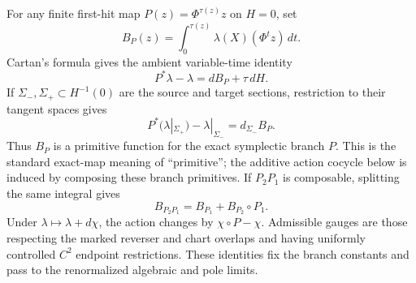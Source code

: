 \documentclass[11pt]{amsart}
\numberwithin{equation}{section}
\theoremstyle{definition}
\theoremstyle{remark}
\begin{document}
For any finite first-hit map $P(z)=\Phi^{\tau(z)}z$ on $H=0$, set
\begin{equation}\label{eq:actual-action}
 B_P(z)=\int_0^{\tau(z)}\lambda(X)(\Phi^tz)\,dt.
\end{equation}
Cartan's formula gives the ambient variable-time identity
\begin{equation}\label{eq:ambient-exact-flight}
 P^*\lambda-\lambda=dB_P+\tau\,dH.
\end{equation}
If $\Sigma_-,\Sigma_+\subset H^{-1}(0)$ are the source and target
sections, restriction to their tangent spaces gives
\begin{equation}\label{eq:exact-flight}
 P^*(\lambda|_{\Sigma_+})-\lambda|_{\Sigma_-}
 =d_{\Sigma_-}B_P.
\end{equation}
Thus $B_P$ is a primitive function for the exact symplectic branch $P$.
This is the standard exact-map meaning of ``primitive''; the additive
action cocycle below is induced by composing these branch primitives.
If $P_2P_1$ is composable, splitting the same integral gives
\begin{equation}\label{eq:action-composition}
 B_{P_2P_1}=B_{P_1}+B_{P_2}\circ P_1.
\end{equation}
Under $\lambda\mapsto\lambda+d\chi$, the action changes by
$\chi\circ P-\chi$.  Admissible gauges are those respecting the marked
reverser and chart overlaps and having uniformly controlled $C^2$ endpoint
restrictions.  These identities fix the branch constants and pass to the
renormalized algebraic and pole limits.
\end{document}
